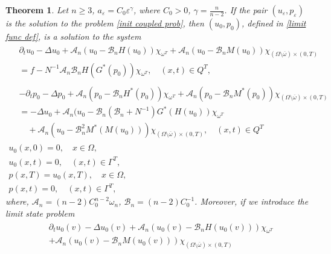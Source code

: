 \documentclass[10pt,a4paper]{amsart}
\numberwithin{equation}{section}
\newtheorem{theorem}{Theorem}[section]
\begin{document}
\begin{theorem} \label{homogenization theorem} 
Let $n\geq 3$, $a_{\varepsilon}=C_0\varepsilon ^{\gamma }$, where $C_0>0$, 
$\gamma = \frac{n}{n-2}$. If the
pair $(u_{\varepsilon },p_{\varepsilon })$ is the solution to the problem
\eqref{init coupled prob}, then $(u_0,p_0)$, defined in \eqref{limit func def}, 
is a solution to the system
\begin{equation}
\begin{gathered}
\begin{aligned}
&\partial _{t}u_0-\Delta u_0+\mathcal{A}_n(u_0-\mathcal{B}%
_nH(u_0))\chi _{\omega ^{T}}  
+\mathcal{A}_n(u_0-\mathcal{B}_nM(u_0))\chi _{(\Omega \setminus
\overline{\omega })\times (0,T)} \\
&=f-N^{-1}\mathcal{A}_n\mathcal{B}
_nH(G^{\ast }(p_0))\chi _{\omega ^{T}}, \quad (x,t)\in Q^{T},
\end{aligned} \\
\begin{aligned}
&-\partial _{t}p_0-\Delta p_0   
+\mathcal{A}_n(p_0-\mathcal{B}_nH^{\ast }(p_0))\chi _{\omega ^{T}}+%
\mathcal{A}_n(p_0-\mathcal{B}_nM^{\ast }(p_0))\chi _{(\Omega
\setminus \overline{\omega })\times (0,T)}   \\
&=-\Delta u_0+\mathcal{A}_n(u_0-\mathcal{B}_n(\mathcal{B}%
_n+N^{-1})G^{\ast }(H(u_0))\chi _{\omega ^{T}}  \\
&\quad +\mathcal{A}_n(u_0-\mathcal{B}_n^2M^{\ast }(M(u_0)))\chi _{(\Omega
\setminus \overline{\omega })\times (0,T)}, \quad  (x,t)\in Q^{T} 
\end{aligned}\\
u_0(x,0)=0, \quad x\in \Omega , \\
u_0(x,t)=0, \quad  (x,t)\in \Gamma ^{T}, \\
p(x,T)=u_0(x,T), \quad  x\in \Omega , \\
p(x,t)=0, \quad  (x,t)\in \Gamma ^{T},
\end{gathered}
\end{equation}   \label{homogenized system}
where, $\mathcal{A}_n = (n-2)C^{n-2}_0\omega_n$, $\mathcal{B}_n = (n-2)C^{-1}_0$.
 Moreover, if we introduce the limit state problem
\begin{equation}
\begin{gathered}
\begin{aligned}
&\partial _{t}u_0(v)-\Delta u_0(v)+\mathcal{A}_n(u_0(v)-\mathcal{B}%
_nH(u_0(v)))\chi _{\omega ^{T}}   \\
&+\mathcal{A}_n(u_0(v)-\mathcal{B}_nM(u_0(v)))\chi _{(\Omega
\setminus \overline{\omega })\times (0,T)} \\

\end{aligned}
\end{gathered}
\end{equation}
\end{theorem}
\end{document}
